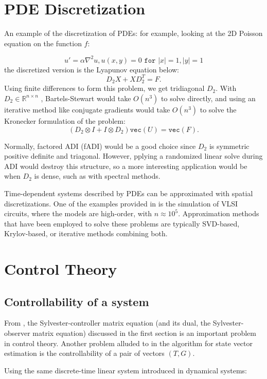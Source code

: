 \documentclass{article}
\begin{document}
\section{PDE Discretization}
An example of the discretization of PDEs: for example, looking at the 2D Poisson equation on the function $f$:

\[
u' = \alpha \nabla ^2 u, u(x, y) = 0 \texttt{ for } |x| = 1, |y| = 1
\]
the discretized version is the Lyapunov equation below:
\[
D_2 X + X D_2^T = F.
\]
Using finite differences to form this problem, we get tridiagonal $D_2$. With $D_2 \in \mathbb{R} ^{n \times n}$ , Bartels-Stewart would take $O(n^3)$ to solve directly, and using an iterative method like conjugate gradients would take $O(n^3)$ to solve the Kronecker formulation of the problem:
\[ 
(D_2 \otimes I+I \otimes D_2) \texttt{vec}(U)= \texttt{vec}(F).
\]

Normally, factored ADI (fADI) would be a good choice since $D_2$ is symmetric positive definite and triagonal. However, pplying a randomized linear solve during ADI would destroy this structure, so a more interesting application would be when $D_2$ is dense, such as with spectral methods.

Time-dependent systems described by PDEs can be approximated with spatial discretizations. One of the examples provided in \cite{Antoulas} is the simulation of VLSI circuits, where the models are high-order, with $n \approx 10^5$. Approximation methods that have been employed to solve these problems are typically SVD-based, Krylov-based, or iterative methods combining both. 


\section{Control Theory}

\subsection{Controllability of a system}
From \cite{Datta}, the Sylvester-controller matrix equation (and its dual, the Sylvester-observer matrix equation) discussed in the first section is an important problem in control theory. Another problem alluded to in the algorithm for state vector estimation is the controllability of a pair of vectors $(T,G)$.

Using the same discrete-time linear system introduced in dynamical systems: 
\end{document}
